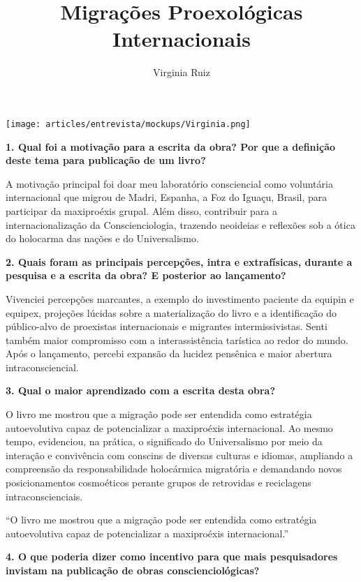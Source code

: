 \documentclass{gescons}
\author{Virginia Ruiz}
\title{Migrações Proexológicas Internacionais}
\begin{document}
    \makeentrevistatitle

    \begin{multicols}{2}


\begin{center}
    \texttt{[image: articles/entrevista/mockups/Virginia.png]}
\end{center}


\textbf{1.       Qual foi a motivação para a escrita da obra? Por que a definição deste tema para publicação de um livro?}

A motivação principal foi doar meu laboratório consciencial como voluntária internacional que migrou de Madri, Espanha, a Foz do Iguaçu, Brasil, para participar da maxiproéxis grupal. Além disso, contribuir para a internacionalização da Conscienciologia, trazendo neoideias e reflexões sob a ótica do holocarma das nações e do Universalismo.


\textbf{2.       Quais foram as principais percepções, intra e extrafísicas, durante a pesquisa e a escrita da obra? E posterior ao lançamento?}

Vivenciei percepções marcantes, a exemplo do investimento paciente da equipin e equipex, projeções lúcidas sobre a materialização do livro e a identificação do público-alvo de proexistas internacionais e migrantes intermissivistas. Senti também maior compromisso com a interassistência tarística ao redor do mundo. Após o lançamento, percebi expansão da lucidez pensênica e maior abertura intraconsciencial.


\textbf{3.       Qual o maior aprendizado com a escrita desta obra?}

O livro me mostrou que a migração pode ser entendida como estratégia autoevolutiva capaz de potencializar a maxiproéxis internacional. Ao mesmo tempo, evidenciou, na prática, o significado do Universalismo por meio da interação e convivência com conscins de diversas culturas e idiomas, ampliando a compreensão da responsabilidade holocármica migratória e demandando novos posicionamentos cosmoéticos perante grupos de retrovidas e reciclagens intraconscienciais.

\begin{pullquote}
    ``O livro me mostrou que a migração pode ser entendida como estratégia autoevolutiva capaz de potencializar a maxiproéxis internacional.''
\end{pullquote}

\textbf{4.       O que poderia dizer como incentivo para que mais pesquisadores invistam na publicação de obras conscienciológicas?}


\end{multicols}
\end{document}
